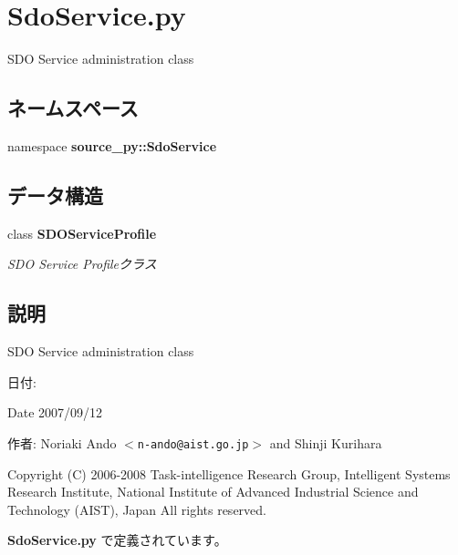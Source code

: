 \section{SdoService.py}
\label{_sdo_service_8py}
SDO Service administration class 

\subsection*{ネームスペース}
\begin{CompactItemize}
\item 
namespace \textbf{source\_\-py::SdoService}
\end{CompactItemize}
\subsection*{データ構造}
\begin{CompactItemize}
\item 
class {\bf SDOServiceProfile}
\begin{CompactList}\small\item\em SDO Service Profileクラス \item\end{CompactList}\end{CompactItemize}


\subsection{説明}
SDO Service administration class 

\begin{Desc}
\item[日付:]\end{Desc}
\begin{Desc}
\item[Date]2007/09/12 \end{Desc}
\begin{Desc}
\item[作者:]Noriaki Ando $<${\tt n-ando@aist.go.jp}$>$ and Shinji Kurihara\end{Desc}
Copyright (C) 2006-2008 Task-intelligence Research Group, Intelligent Systems Research Institute, National Institute of Advanced Industrial Science and Technology (AIST), Japan All rights reserved. 

 {\bf SdoService.py} で定義されています。
